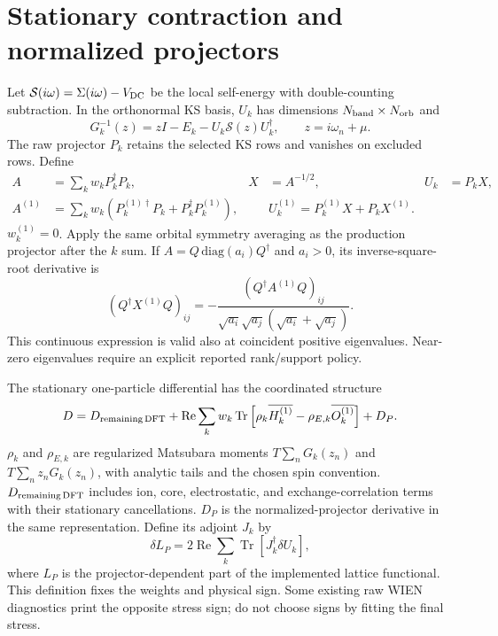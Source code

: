 \documentclass[11pt]{article}
\newcommand{\Tr}{\operatorname{Tr}}
\newcommand{\Rea}{\operatorname{Re}}
\newcommand{\Sig}{\mathcal S}
\begin{document}
\section{Stationary contraction and normalized projectors}
Let $\Sig(i\omega)=\Sigma(i\omega)-V_{\rm DC}$ be the local self-energy with double-counting subtraction. In the orthonormal KS basis, $U_k$ has dimensions $N_{\rm band}\times N_{\rm orb}$ and
\begin{equation}
G_k^{-1}(z)=zI-E_k-U_k\Sig(z)U_k^\dagger,\qquad z=i\omega_n+\mu.
\end{equation}
The raw projector $P_k$ retains the selected KS rows and vanishes on excluded rows. Define
\begin{align}
A&=\sum_k w_kP_k^\dagger P_k,& X&=A^{-1/2},&U_k&=P_kX,\\
A^{(1)}&=\sum_k w_k(P_k^{(1)\dagger}P_k+P_k^\dagger P_k^{(1)}),&&
U_k^{(1)}=P_k^{(1)}X+P_kX^{(1)}.
\end{align}
$w_k^{(1)}=0$. Apply the same orbital symmetry averaging as the production projector after the $k$ sum. If $A=Q\,\mathrm{diag}(a_i)Q^\dagger$ and $a_i>0$, its inverse-square-root derivative is
\begin{equation}
(Q^\dagger X^{(1)}Q)_{ij}=
-\frac{(Q^\dagger A^{(1)}Q)_{ij}}
{\sqrt{a_i}\sqrt{a_j}(\sqrt{a_i}+\sqrt{a_j})}.
\end{equation}
This continuous expression is valid also at coincident positive eigenvalues. Near-zero eigenvalues require an explicit reported rank/support policy.

The stationary one-particle differential has the coordinated structure
\begin{equation}\label{variation}
D=D_{\rm remaining\,DFT}+\Rea\sum_k w_k\Tr\left[
\rho_k\overline{H_k^{(1)}}-\rho_{E,k}\overline{O_k^{(1)}}\right]+D_P.
\end{equation}
$\rho_k$ and $\rho_{E,k}$ are regularized Matsubara moments $T\sum_nG_k(z_n)$ and $T\sum_nz_nG_k(z_n)$, with analytic tails and the chosen spin convention. $D_{\rm remaining\,DFT}$ includes ion, core, electrostatic, and exchange-correlation terms with their stationary cancellations. $D_P$ is the normalized-projector derivative in the same representation. Define its adjoint $J_k$ by
\begin{equation}
\delta L_P=2\Rea\sum_k\Tr[J_k^\dagger\delta U_k],
\end{equation}
where $L_P$ is the projector-dependent part of the implemented lattice functional. This definition fixes the weights and physical sign. Some existing raw WIEN diagnostics print the opposite stress sign; do not choose signs by fitting the final stress.
\end{document}
